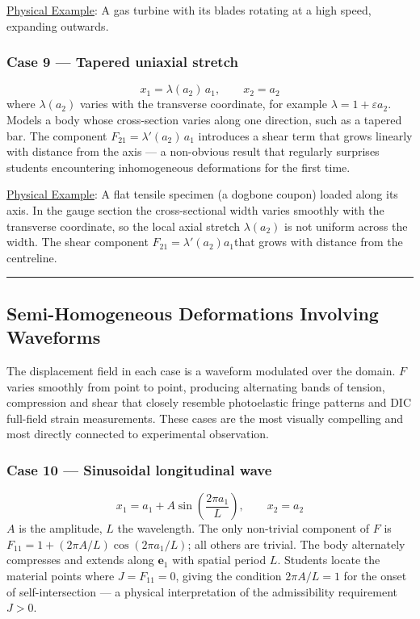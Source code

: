 \documentclass[11pt]{article}
\begin{document}
\uline{Physical Example}: A gas turbine with its blades rotating at a high speed, expanding outwards.
\subsubsection*{Case 9 — Tapered uniaxial stretch}
\label{sec:orgd7cfa3c}
\[
  x_1 = \lambda(a_2)\, a_1, \qquad x_2 = a_2
\]
where \(\lambda(a_2)\) varies with the transverse coordinate, for
example \(\lambda = 1 + \varepsilon a_2\).  Models a body whose
cross-section varies along one direction, such as a tapered bar.  The
component \(F_{21} = \lambda'(a_2)\,a_1\) introduces a shear term that
grows linearly with distance from the axis — a non-obvious result that
regularly surprises students encountering inhomogeneous deformations
for the first time.

\uline{Physical Example}: A flat tensile specimen (a dogbone coupon) loaded along its axis. In the gauge section the cross-sectional width varies smoothly with the transverse coordinate, so the local axial stretch \(\lambda(a_2)\) is not uniform across the width. The shear component \(F_{21} = \lambda'(a_2) a_1\)​ that grows with distance from the centreline. 

\noindent\rule{\textwidth}{0.5pt}
\subsection*{Semi-Homogeneous Deformations Involving Waveforms}
\label{sec:orgd39617e}

The displacement field in each case is a waveform modulated over the
domain.  \(F\) varies smoothly from point to point, producing alternating
bands of tension, compression and shear that closely resemble
photoelastic fringe patterns and DIC full-field strain measurements.
These cases are the most visually compelling and most directly
connected to experimental observation.
\subsubsection*{Case 10 — Sinusoidal longitudinal wave}
\label{sec:org780199e}
\[
  x_1 = a_1 + A\sin\!\left(\frac{2\pi a_1}{L}\right), \qquad
  x_2 = a_2
\]
\(A\) is the amplitude, \(L\) the wavelength.  The only non-trivial
component of \(F\) is \(F_{11} = 1 + (2\pi A/L)\cos(2\pi a_1/L)\); all
others are trivial.  The body alternately compresses and extends along
\(\mathbf{e}_1\) with spatial period \(L\).  Students locate the material
points where \(J = F_{11} = 0\), giving the condition \(2\pi A/L = 1\)
for the onset of self-intersection — a physical interpretation of the
admissibility requirement \(J > 0\).
\end{document}

